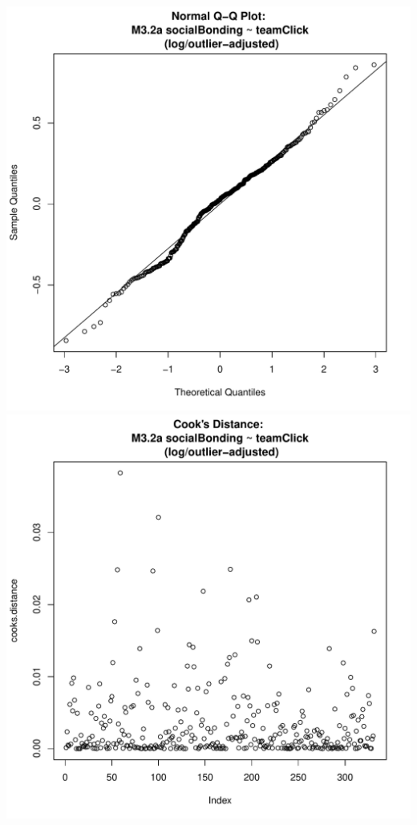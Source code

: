 \documentclass[12pt]{report}
\begin{document}
\includegraphics[scale =.4]{../images/MLM32aOutLogQQNorm.pdf}
\includegraphics[scale =.4]{../images/MLM32aOutLogCooksD.pdf}

\newpage
\end{document}
